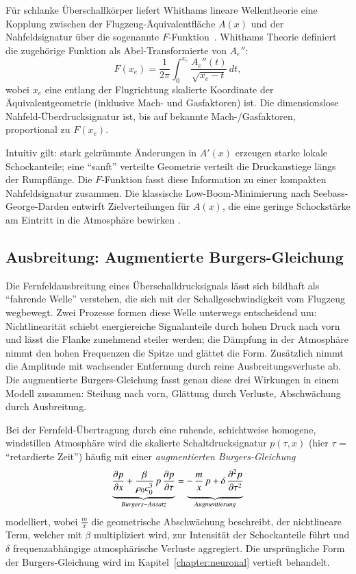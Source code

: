 Für schlanke Überschallkörper liefert Whithams lineare Wellentheorie eine
Kopplung zwischen der Flugzeug-Äquivalentfläche $A(x)$ und der
Nahfeldsignatur über die sogenannte $F$-Funktion~\cite{schall:whitham}.
Whithams Theorie definiert die zugehörige Funktion
als Abel-Transformierte von $A_e''$:
\begin{equation*}
    F(x_e)=\frac{1}{2\pi}\int_{0}^{x_e}\frac{A_e''(t)}{\!\sqrt{x_e-t}}\,dt,
\end{equation*}
wobei $x_e$ eine entlang der Flugrichtung skalierte Koordinate
der Äquivalentgeometrie (inklusive Mach- und Gasfaktoren) ist.
Die dimensionslose Nahfeld-Überdrucksignatur ist, bis auf bekannte
Mach-/Gasfaktoren, proportional zu $F(x_e)$.

Intuitiv gilt: stark gekrümmte Änderungen in $A'(x)$ erzeugen starke lokale
Schockanteile; eine ``sanft'' verteilte Geometrie verteilt die Druckanstiege
längs der Rumpflänge.
Die $F$-Funktion fasst diese Information zu einer kompakten Nahfeldsignatur zusammen.
Die klassische Low-Boom-Minimierung nach Seebass-George-Darden entwirft
Zielverteilungen für $A(x)$, die eine geringe Schockstärke am Eintritt in
die Atmosphäre bewirken \cite{schall:whitham,schall:seebassgeorge,schall:darden75}.

\subsection{Ausbreitung: Augmentierte Burgers-Gleichung}
Die Fernfeldausbreitung eines Überschalldrucksignals lässt sich bildhaft als
``fahrende Welle'' verstehen, die sich mit der Schallgeschwindigkeit vom
Flugzeug wegbewegt.
Zwei Prozesse formen diese Welle unterwegs entscheidend um:
Nichtlinearität schiebt energiereiche Signalanteile durch hohen
Druck nach vorn und lässt die Flanke zunehmend steiler werden;
die Dämpfung in der Atmosphäre nimmt den hohen Frequenzen die Spitze
%
und glättet die Form.
Zusätzlich nimmt die Amplitude mit wachsender Entfernung durch reine
Ausbreitungsverluste ab.
Die augmentierte Burgers-Gleichung fasst genau diese drei
Wirkungen in einem Modell zusammen: Steilung nach vorn, Glättung durch
Verluste, Abschwächung durch Ausbreitung.

Bei der Fernfeld-Übertragung durch eine ruhende, schichtweise homogene,
windstillen Atmosphäre wird die skalierte Schaltdrucksignatur $p(\tau,x)$
(hier $\tau$ = ``retardierte Zeit'') häufig mit einer
\emph{augmentierten Burgers-Gleichung}
\begin{equation}
  \underbrace{\frac{\partial p}{\partial x}
  +\frac{\beta}{\rho_0 c_0^{3}}\,p\,\frac{\partial p}{\partial \tau}}_{Burgers-Ansatz}
  =
  \underbrace{-\,\frac{m}{x}\,p \vphantom{\frac{\beta}{\rho_0 c_0^{3}}}
  +\delta\,\frac{\partial^2 p}{\partial \tau^2}}_{Augmentierung}
  \label{eq:aug-burgers}
\end{equation}
modelliert,
wobei $\frac{m}{x}$ die geometrische Abschwächung beschreibt, der nichtlineare
Term, welcher mit $\beta$ multipliziert wird, zur Intensität der Schockanteile
führt und $\delta$ frequenzabhängige atmosphärische Verluste aggregiert.
Die ursprüngliche Form der Burgers-Gleichung wird im
Kapitel~\ref{chapter:neuronal} vertieft behandelt.

